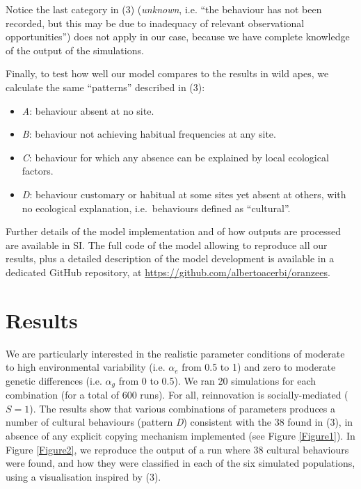 \documentclass[9pt,twocolumn,twoside,]{pnas-new}
\begin{document}
Notice the last category in (3) (\emph{unknown}, i.e. ``the behaviour
has not been recorded, but this may be due to inadequacy of relevant
observational opportunities'') does not apply in our case, because we
have complete knowledge of the output of the simulations.

Finally, to test how well our model compares to the results in wild
apes, we calculate the same ``patterns'' described in (3):

\begin{itemize}
\item
  \emph{A}: behaviour absent at no site.
\item
  \emph{B}: behaviour not achieving habitual frequencies at any site.
\item
  \emph{C}: behaviour for which any absence can be explained by local
  ecological factors.
\item
  \emph{D}: behaviour customary or habitual at some sites yet absent at
  others, with no ecological explanation, i.e.~behaviours defined as
  ``cultural''.
\end{itemize}

Further details of the model implementation and of how outputs are
processed are available in SI. The full code of the model allowing to
reproduce all our results, plus a detailed description of the model
development is available in a dedicated GitHub repository, at
\url{https://github.com/albertoacerbi/oranzees}.

\section*{Results}\label{results}

We are particularly interested in the realistic parameter conditions of
moderate to high environmental variability (i.e. \(\alpha_e\) from 0.5
to 1) and zero to moderate genetic differences (i.e. \(\alpha_g\) from 0
to 0.5). We ran 20 simulations for each combination (for a total of 600
runs). For all, reinnovation is socially-mediated (\(S=1\)). The results
show that various combinations of parameters produces a number of
cultural behaviours (pattern \emph{D}) consistent with the 38 found in
(3), in absence of any explicit copying mechanism implemented (see
Figure \ref{Figure1}). In Figure \ref{Figure2}, we reproduce the output
of a run where 38 cultural behaviours were found, and how they were
classified in each of the six simulated populations, using a
visualisation inspired by (3).
\end{document}
